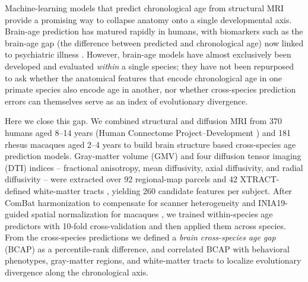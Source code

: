 Machine-learning models that predict chronological age from structural MRI provide a promising way to collapse anatomy onto a single developmental axis. Brain-age prediction has matured rapidly in humans, with biomarkers such as the brain-age gap (the difference between predicted and chronological age) now linked to psychiatric illness \cite{cole2017predicting, franke2010estimating, hajek2019brain, mcwhinney2021obesity}. However, brain-age models have almost exclusively been developed and evaluated \textit{within} a single species; they have not been repurposed to ask whether the anatomical features that encode chronological age in one primate species also encode age in another, nor whether cross-species prediction errors can themselves serve as an index of evolutionary divergence.

Here we close this gap. We combined structural and diffusion MRI from 370 humans aged 8--14 years (Human Connectome Project--Development \cite{somerville2018lifespan, harms2018extending}) and 181 rhesus macaques aged 2--4 years to build brain structure based cross-species age prediction models. Gray-matter volume (GMV) and four diffusion tensor imaging (DTI) indices -- fractional anisotropy, mean diffusivity, axial diffusivity, and radial diffusivity -- were extracted over 92 regional-map parcels \cite{bezgin2012hierarchical} and 42 XTRACT-defined white-matter tracts \cite{warrington2020xtract}, yielding 260 candidate features per subject. After ComBat harmonization to compensate for scanner heterogeneity \cite{fortin2017harmonization_dti, fortin2017harmonization_thickness, johnson2007adjusting} and INIA19-guided spatial normalization for macaques \cite{rohlfing2012inia19}, we trained within-species age predictors with 10-fold cross-validation and then applied them across species. From the cross-species predictions we defined a \textit{brain cross-species age gap} (BCAP) as a percentile-rank difference, and correlated BCAP with behavioral phenotypes, gray-matter regions, and white-matter tracts to localize evolutionary divergence along the chronological axis.

